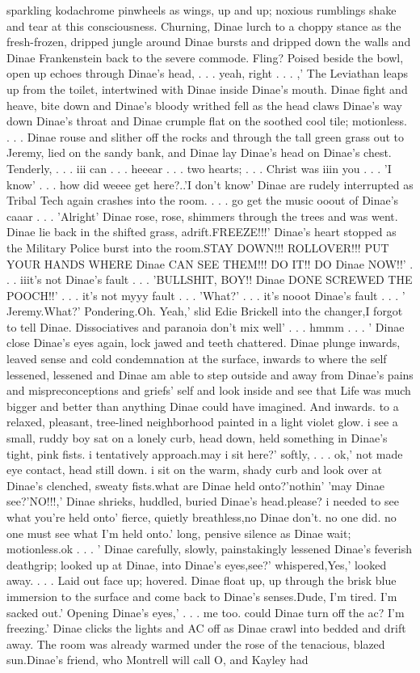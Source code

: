 \documentclass[12pt]{book}
\begin{document}
sparkling kodachrome pinwheels as wings, up and up; noxious rumblings shake and tear at this consciousness. Churning, Dinae lurch to a choppy stance as the fresh-frozen, dripped jungle around Dinae bursts and dripped down the walls and Dinae Frankenstein back to the severe commode. Fling? Poised beside the bowl, open up echoes through Dinae's head, . . . yeah, right . . . ,' The Leviathan leaps up from the toilet, intertwined with Dinae inside Dinae's mouth. Dinae fight and heave, bite down and Dinae's bloody writhed fell as the head claws Dinae's way down Dinae's throat and Dinae crumple flat on the soothed cool tile; motionless.  . . .  Dinae rouse and slither off the rocks and through the tall green grass out to Jeremy, lied on the sandy bank, and Dinae lay Dinae's head on Dinae's chest. Tenderly, . . . iii can . . . heeear . . . two hearts;  . . . Christ was iiin you . . . 'I know' . . . how did weeee get here?..'I don't know' Dinae are rudely interrupted as Tribal Tech again crashes into the room. . . . go get the music ooout of Dinae's caaar . . . 'Alright' Dinae rose, rose, shimmers through the trees and was went. Dinae lie back in the shifted grass, adrift.FREEZE!!!' Dinae's heart stopped as the Military Police burst into the room.STAY DOWN!!! ROLLOVER!!! PUT YOUR HANDS WHERE Dinae CAN SEE THEM!!! DO IT!! DO Dinae NOW!!' . . .  iiit's not Dinae's fault . . . 'BULLSHIT, BOY!! Dinae DONE SCREWED THE POOCH!!' . . . it's not myyy fault . . . 'What?' . . . it's nooot Dinae's fault . . . ' Jeremy.What?' Pondering.Oh. Yeah,' slid Edie Brickell into the changer,I forgot to tell Dinae. Dissociatives and paranoia don't mix well' . . . hmmm . . . ' Dinae close Dinae's eyes again, lock jawed and teeth chattered. Dinae plunge inwards, leaved sense and cold condemnation at the surface, inwards to where the self lessened, lessened and Dinae am able to step outside and away from Dinae's pains and mispreconceptions and griefs' self and look inside and see that Life was much bigger and better than anything Dinae could have imagined. And inwards. to a relaxed, pleasant, tree-lined neighborhood painted in a light violet glow. i see a small, ruddy boy sat on a lonely curb, head down, held something in Dinae's tight, pink fists. i tentatively approach.may i sit here?' softly, . . . ok,' not made eye contact, head still down. i sit on the warm, shady curb and look over at Dinae's clenched, sweaty fists.what are Dinae held onto?'nothin' 'may Dinae see?'NO!!!,' Dinae shrieks, huddled, buried Dinae's head.please? i needed to see what you're held onto' fierce, quietly breathless,no Dinae don't. no one did. no one must see what I'm held onto.' long, pensive silence as Dinae wait; motionless.ok . . . ' Dinae carefully, slowly, painstakingly lessened Dinae's feverish deathgrip; looked up at Dinae, into Dinae's eyes,see?' whispered,Yes,' looked away.  . . .  Laid out face up; hovered. Dinae float up, up through the brisk blue immersion to the surface and come back to Dinae's senses.Dude, I'm tired. I'm sacked out.' Opening Dinae's eyes,' . . . me too. could Dinae turn off the ac? I'm freezing.' Dinae clicks the lights and AC off as Dinae crawl into bedded and drift away. The room was already warmed under the rose of the tenacious, blazed sun.Dinae's friend, who Montrell will call O, and Kayley had 
\end{document}
